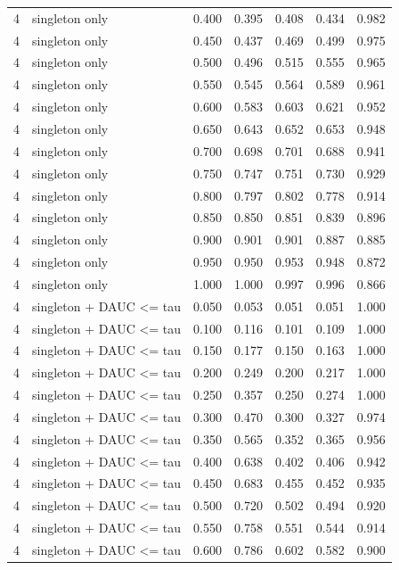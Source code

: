 \begin{tabular}{rlrrrrr}
4 & singleton only & 0.400 & 0.395 & 0.408 & 0.434 & 0.982 \\
4 & singleton only & 0.450 & 0.437 & 0.469 & 0.499 & 0.975 \\
4 & singleton only & 0.500 & 0.496 & 0.515 & 0.555 & 0.965 \\
4 & singleton only & 0.550 & 0.545 & 0.564 & 0.589 & 0.961 \\
4 & singleton only & 0.600 & 0.583 & 0.603 & 0.621 & 0.952 \\
4 & singleton only & 0.650 & 0.643 & 0.652 & 0.653 & 0.948 \\
4 & singleton only & 0.700 & 0.698 & 0.701 & 0.688 & 0.941 \\
4 & singleton only & 0.750 & 0.747 & 0.751 & 0.730 & 0.929 \\
4 & singleton only & 0.800 & 0.797 & 0.802 & 0.778 & 0.914 \\
4 & singleton only & 0.850 & 0.850 & 0.851 & 0.839 & 0.896 \\
4 & singleton only & 0.900 & 0.901 & 0.901 & 0.887 & 0.885 \\
4 & singleton only & 0.950 & 0.950 & 0.953 & 0.948 & 0.872 \\
4 & singleton only & 1.000 & 1.000 & 0.997 & 0.996 & 0.866 \\
4 & singleton + DAUC <= tau & 0.050 & 0.053 & 0.051 & 0.051 & 1.000 \\
4 & singleton + DAUC <= tau & 0.100 & 0.116 & 0.101 & 0.109 & 1.000 \\
4 & singleton + DAUC <= tau & 0.150 & 0.177 & 0.150 & 0.163 & 1.000 \\
4 & singleton + DAUC <= tau & 0.200 & 0.249 & 0.200 & 0.217 & 1.000 \\
4 & singleton + DAUC <= tau & 0.250 & 0.357 & 0.250 & 0.274 & 1.000 \\
4 & singleton + DAUC <= tau & 0.300 & 0.470 & 0.300 & 0.327 & 0.974 \\
4 & singleton + DAUC <= tau & 0.350 & 0.565 & 0.352 & 0.365 & 0.956 \\
4 & singleton + DAUC <= tau & 0.400 & 0.638 & 0.402 & 0.406 & 0.942 \\
4 & singleton + DAUC <= tau & 0.450 & 0.683 & 0.455 & 0.452 & 0.935 \\
4 & singleton + DAUC <= tau & 0.500 & 0.720 & 0.502 & 0.494 & 0.920 \\
4 & singleton + DAUC <= tau & 0.550 & 0.758 & 0.551 & 0.544 & 0.914 \\
4 & singleton + DAUC <= tau & 0.600 & 0.786 & 0.602 & 0.582 & 0.900 \\

\end{tabular}
